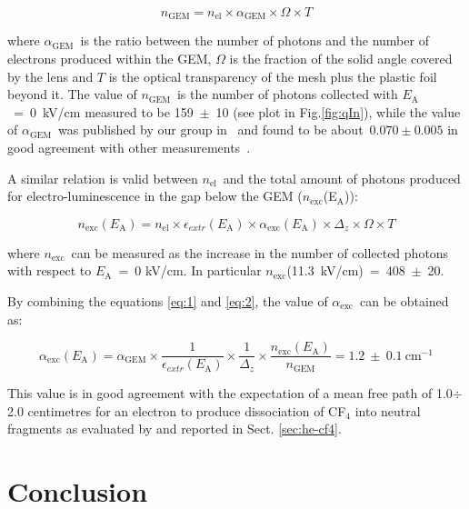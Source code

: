 \documentclass[a4paper,11pt]{article}
\newcommand{\Ea}  {$E_{\mathrm{A}}$}
\newcommand{\nel}  {$n_{\mathrm{el}}$}
\newcommand{\ngem}  {$n_{\mathrm{GEM}}$}
\newcommand{\agem}  {$\alpha_{\mathrm{GEM}}$}
\newcommand{\nm}  {$n_{\mathrm{exc}}$}
\newcommand{\aex}  {$\alpha_{\mathrm{exc}}$}
\begin{document}
\begin{equation}
n_{\mathrm{GEM}} = n_{\mathrm{el}} \times \alpha_{\mathrm{GEM}} \times \Omega \times T
\label{eq:1}
\end{equation}

where \agem\ is the ratio between the number of photons and the number of electrons produced within the GEM, $\Omega$ is the fraction of the solid angle covered by the lens and $T$ is the optical transparency of the mesh plus the plastic foil beyond it.
The value of \ngem\ is the number of photons collected with \Ea~=~0~kV/cm measured to be 159~$\pm$~10 (see plot in Fig.\ref{fig:qIn}), while the value of \agem\ was published by our group in~\cite{bib:ieee_orange} and found to be about~$0.070\pm0.005$ in good agreement with other measurements~\cite{bib:Margato1}.

A similar relation is valid between \nel\ and the total amount of photons produced for electro-luminescence in the gap below the GEM (\nm(E$_{\mathrm{A}}$)):

\begin{equation}
n_{\mathrm{exc}}(E_{\mathrm{A}}) =  n_{\mathrm{el}} \times \epsilon_{extr}(E_{\mathrm{A}}) \times \alpha_{\mathrm{exc}}(E_{\mathrm{A}}) \times \Delta_z \times \Omega \times T 
\label{eq:2}
\end{equation}

where \nm\ can be measured as the increase in the number of collected photons with respect to \Ea~=~0 kV/cm. 
In particular $n_{\mathrm{exc}}$(11.3~kV/cm)~=~408~$\pm$~20.

By combining the equations \ref{eq:1} and \ref{eq:2}, the value of \aex\ can be obtained as:

\begin{equation}
\alpha_{\mathrm{exc}}(E_{\mathrm{A}}) = \alpha_{\mathrm{GEM}} \times \frac{1}{\epsilon_{extr}(E_{\mathrm{A}})} \times \frac{1}{\Delta_z} \times \frac{n_{\mathrm{exc}}(E_{\mathrm{A}})}{n_{\mathrm{GEM}}} = 1.2~\pm~0.1~{\mathrm{cm}} ^{-1}
\end{equation}

This value is in good agreement with the expectation of a mean free path of 1.0$\div$2.0 centimetres for an electron to produce dissociation of CF$_4$ into neutral fragments as evaluated by \cite{bib:Fraga_beaune} and reported in Sect. \ref{sec:he-cf4}.

\section{Conclusion}
\end{document}
